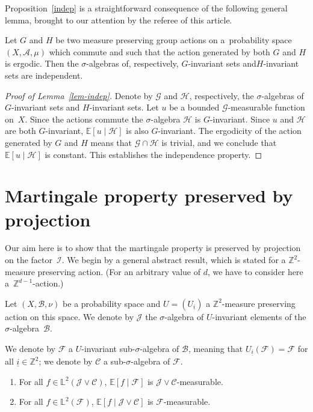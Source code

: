 \documentclass[AHL,Unicode,longabstracts,published]{cedram}
\newcommand{\Z}{\mathbb{Z}}
\newcommand*\bbL{\mathbb{L}}
\newcommand{\bbE}{\mathbb{E}}
\newcommand*\I{\mathcal{I}}
\newcommand*\J{\mathcal{J}}
\newcommand*\C{\mathcal{C}}
\newcommand*\A{\mathcal{A}}
\newcommand*\B{\mathcal{B}}
\newcommand*\F{\mathcal{F}}
\newcommand*\clH{\mathcal{H}}
\newcommand*\G{\mathcal{G}}
\newcommand*{\relabel}{\renewcommand{\labelenumi}{(\theenumi)}}
\newcommand*{\romanenumi}{\renewcommand*{\theenumi}{\roman{enumi}}\relabel}
\begin{document}
Proposition~\ref{indep} is a straightforward consequence of the following general lemma, brought to our attention by the referee of this article.

\begin{lemm}\label{lem-indep}
Let $G$ and $H$ be two measure preserving group actions on a~probability space $(X,\A,\mu)$ which commute and such that the action generated by both $G$ and $H$ is ergodic. Then the $\sigma$-algebras of, respectively, $G$-invariant sets and\linebreak $H$-invariant sets are independent.
\end{lemm}

\begin{proof}[Proof of Lemma~\ref{lem-indep}]
Denote by $\G$ and $\clH$, respectively, the $\sigma$-algebras of \linebreak $G$-invariant sets and $H$-invariant sets. Let $u$ be a bounded $\G$-measurable function on~$X$. Since the actions commute the $\sigma$-algebra $\clH$ is $G$-invariant. Since $u$ and $\clH$ are both $G$-invariant, $\bbE[u\mid\clH]$ is also $G$-invariant. The ergodicity of the action generated by $G$ and $H$ means that $\G\cap\clH$ is trivial, and we conclude that $\bbE[u\mid\clH]$ is constant. This establishes the independence property.
\end{proof}


\section{Martingale property preserved by projection}\label{proj-mart}

Our aim here is to show that the martingale property is preserved by projection on the factor~$\I$. We begin by a general abstract result, which is stated for a $\Z^{2}$-measure preserving action. (For an arbitrary value of $d$, we have to consider here a~$\Z^{d-1}$-action.) 

Let $(X,\B,\nu)$ be a probability space and $U=(U_{\underline{i}})$ a $\Z^2$-measure preserving action on this space. We denote by $\J$ the $\sigma$-algebra of $U$-invariant elements of the $\sigma$-algebra~$\B$.

We denote by $\F$ a $U$-invariant sub-$\sigma$-algebra of $\B$, meaning that $U_{\underline{i}}(\F)=\F$ for all $\underline{i}\in\Z^2$; we denote by $\C$ a sub-$\sigma$-algebra of $\F$.

\begin{prop}\label{pro}
\leavevmode
\begin{enumerate}\romanenumi
\item\label{assertion_EfF_mea}
For all $f\in \bbL^2(\J\vee\C)$, $\bbE[f\mid\F]$ is $\J\vee\C$-measurable.
\item\label{assertion_F_mes_J_vee_C}
For all $f\in \bbL^2(\F)$, $\bbE[f\mid\J\vee\C]$ is $\F$-measurable.
\end{enumerate}
\end{prop}
\end{document}
